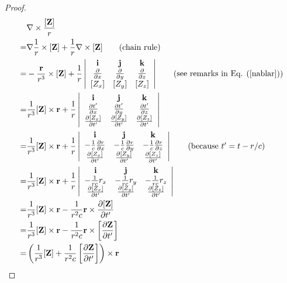\documentclass[11pt]{article}              %
\begin{document}
\begin{proof}
\begin{align}
    &\nabla\times\frac{[{\mathbf Z}]}{r}\notag\\
    =&\nabla\frac{1}{r}\times[{\mathbf Z}]+\frac{1}{r}\nabla\times[{\mathbf Z}]\tag{chain rule}\\
    =&-\frac{\mathbf r}{r^3}\times[{\mathbf Z}]+
    \frac{1}{r}
    \left|\begin{array}{ccc}{\mathbf i}&{\mathbf j}&{\mathbf k}\\ 
    \frac{\partial}{\partial x}&\frac{\partial}{\partial y}&\frac{\partial}{\partial z}\\
    {[}Z_x]&[Z_y]&[Z_z]\\\end{array}\right|
    \tag{see remarks in Eq. (\ref{nablar})}\\
    =&\frac{1}{r^3}[{\mathbf Z}]\times{\mathbf r}+\frac{1}{r}
    \left|\begin{array}{ccc}{\mathbf i}&{\mathbf j}&{\mathbf k}\\ 
    \frac{\partial t^\prime}{\partial x}&\frac{\partial t^\prime}{\partial y}&\frac{\partial t^\prime}{\partial z}\\
    \frac{\partial [Z_x]}{\partial t^\prime}&\frac{\partial [Z_y]}{\partial t^\prime}&\frac{\partial [Z_z]}{\partial t^\prime}\end{array}\right|\notag\\
    =&\frac{1}{r^3}[{\mathbf Z}]\times{\mathbf r}+\frac{1}{r}
    \left|\begin{array}{ccc}{\mathbf i}&{\mathbf j}&{\mathbf k}\\ 
    -\frac{1}{c}\frac{\partial r}{\partial x}&-\frac{1}{c}\frac{\partial r}{\partial y}&-\frac{1}{c}\frac{\partial r}{\partial z}\\
    \frac{\partial [Z_x]}{\partial t^\prime}&\frac{\partial [Z_y]}{\partial t^\prime}&\frac{\partial [Z_z]}{\partial t^\prime}\end{array}\right|\tag{because $t^\prime=t-r/c$}\\
    =&\frac{1}{r^3}[{\mathbf Z}]\times{\mathbf r}+\frac{1}{r}
    \left|\begin{array}{ccc}{\mathbf i}&{\mathbf j}&{\mathbf k}\\ 
    -\frac{1}{rc}r_x&-\frac{1}{rc}r_y&-\frac{1}{rc}r_z\\
    \frac{\partial [Z_x]}{\partial t^\prime}&\frac{\partial [Z_y]}{\partial t^\prime}&\frac{\partial [Z_z]}{\partial t^\prime}\end{array}\right|\notag\notag\\
    =&\frac{1}{r^3}[{\mathbf Z}]\times{\mathbf r}- \frac{1}{r^2c}{\mathbf r}\times\frac{\partial [{\mathbf Z}]}{\partial t^\prime}\notag\\ 
    =&\frac{1}{r^3}[{\mathbf Z}]\times{\mathbf r}- \frac{1}{r^2c}{\mathbf r}\times\left[\frac{\partial {\mathbf Z}}{\partial t^\prime}\right]\notag\\
    =&\left(\frac{1}{r^3}[{\mathbf Z}]+\frac{1}{r^2c}\left[\frac{\partial {\mathbf Z}}{\partial t^\prime}\right]\right)\times {\mathbf r}
    \notag
\end{align}
\end{proof}



\end{document}
